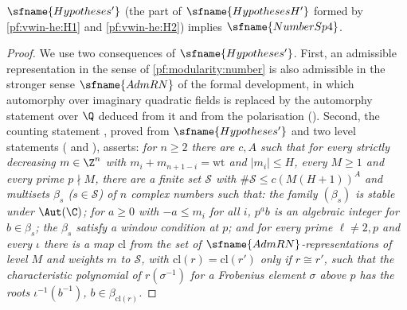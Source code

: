 \begin{proposition}\label{pf:modularity:numberSp4}
$\sfname{Hypotheses'}$ (the part of $\sfname{HypothesesH'}$ formed by \ref{pf:vwin-he:H1} and \ref{pf:vwin-he:H2})
implies $\sfname{NumberSp4}$.
\end{proposition}

\begin{proof}
We use two consequences of $\sfname{Hypotheses'}$. First, an admissible representation in the sense of
\cref{pf:modularity:number} is also admissible in the stronger sense $\sfname{AdmRN}$ of the formal development, in which
automorphy over imaginary quadratic fields is replaced by the automorphy statement over $\Q$ deduced from it and from the
polarisation (). Second, the counting statement
, proved from $\sfname{Hypotheses'}$ and two level statements
( and ),
asserts: \emph{for $n\ge2$ there are $c,A$ such that for every strictly decreasing $m\in\Z^n$ with
$m_i+m_{n+1-i}=\mathrm{wt}$ and $|m_i|\le H$, every $M\ge1$ and every prime $p\nmid M$, there are a finite set $\mathcal S$
with $\#\mathcal S\le c(M(H+1))^A$ and multisets $\beta_s$ ($s\in\mathcal S$) of $n$ complex numbers such that: the family
$(\beta_s)$ is stable under $\Aut(\C)$; for $a\ge0$ with $-a\le m_i$ for all $i$, $p^ab$ is an algebraic integer for
$b\in\beta_s$; the $\beta_s$ satisfy a window condition at $p$; and for every prime $\ell\ne2,p$ and every $\iota$ there
is a map $\mathrm{cl}$ from the set of $\sfname{AdmRN}$-representations of level $M$ and weights $m$ to $\mathcal S$,
with $\mathrm{cl}(r)=\mathrm{cl}(r')$ only if $r\cong r'$, such that the characteristic polynomial of $r(\sigma^{-1})$ for
a Frobenius element $\sigma$ above $p$ has the roots $\iota^{-1}(b^{-1})$, $b\in\beta_{\mathrm{cl}(r)}$.}


\end{proof}
